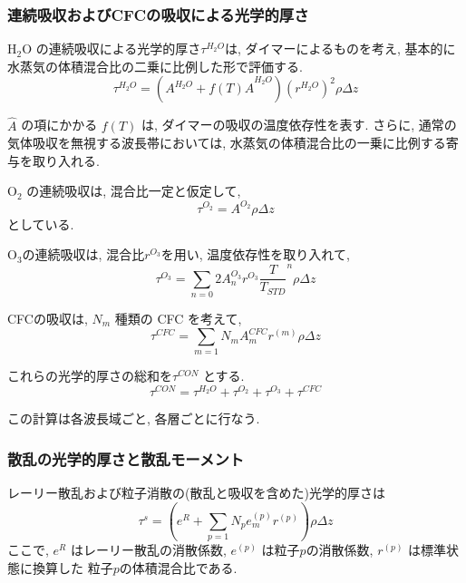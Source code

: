 \subsubsection{連続吸収およびCFCの吸収による光学的厚さ }

H$_2$O の連続吸収による光学的厚さ$\tau^{H_2O}$は,
ダイマーによるものを考え, 
基本的に水蒸気の体積混合比の二乗に比例した形で評価する.
\begin{equation}
\tau^{H_2O} = ( A^{H_2O} + f(T) \hat{A}^{H_2O} ) (r^{H_2O})^2 \rho \Delta z
\end{equation}

$\hat{A}$ の項にかかる $f(T)$ は, 
ダイマーの吸収の温度依存性を表す.
さらに, 通常の気体吸収を無視する波長帯においては,
水蒸気の体積混合比の一乗に比例する寄与を取り入れる.

O$_2$ の連続吸収は, 混合比一定と仮定して,
\begin{equation}
\tau^{O_2} = A^{O_2} \rho \Delta z
\end{equation}
としている.

O$_3$の連続吸収は, 混合比$r^{O_3}$を用い, 温度依存性を取り入れて,
\begin{equation}
\tau^{O_3} = \sum_{n=0}{2} A^{O_3}_n r^{O_3} \frac{T}{T_{STD}}^n \rho \Delta z
\end{equation}

CFCの吸収は, $N_m$ 種類の CFC を考えて,
\begin{equation}
\tau^{CFC} = \sum_{m=1}{N_m} A^{CFC}_m r^{(m)} \rho \Delta z
\end{equation}

これらの光学的厚さの総和を$\tau^{CON}$ とする.
\begin{equation}
 \tau^{CON} =  \tau^{H_2O} + \tau^{O_2} + \tau^{O_3} + \tau^{CFC} 
\end{equation}

この計算は各波長域ごと, 各層ごとに行なう.

\subsubsection{散乱の光学的厚さと散乱モーメント }

レーリー散乱および粒子消散の(散乱と吸収を含めた)光学的厚さは
\begin{equation}
\tau^{s} 
 = \left( e^R + \sum_{p=1}{N_p} e^{(p)}_m r^{(p)}\right) \rho \Delta z
\end{equation}
ここで, $e^R$ はレーリー散乱の消散係数,
$e^{(p)}$ は粒子$p$の消散係数,
$r^{(p)}$ は標準状態に換算した
粒子$p$の体積混合比である.

